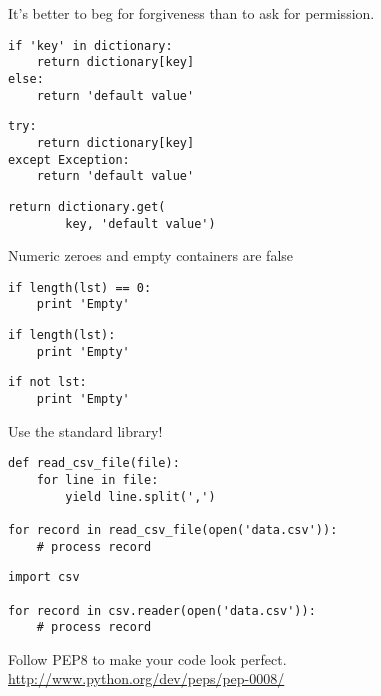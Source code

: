 \documentclass[10pt]{article}
\newenvironment{items}{\begin{itemize*}\setlength\itemsep{0pt}\setlength\parskip{0pt}\setlength\parsep{0pt}}{\end{itemize*}}
\begin{document}
\begin{items}
\item It's better to beg for forgiveness than to ask for permission.
\begin{multicols}{3}\small
\colorbox{silver}{\hspace{0.8\columnwidth}}
\begin{verbatim}
if 'key' in dictionary:
    return dictionary[key]
else:
    return 'default value'
\end{verbatim}
\columnbreak
\colorbox{silver}{\hspace{0.8\columnwidth}}
\begin{verbatim}
try:
    return dictionary[key]
except Exception:
    return 'default value'
\end{verbatim}
\columnbreak
\colorbox{silver}{\hspace{0.8\columnwidth}}
\begin{verbatim}
return dictionary.get(
        key, 'default value')
\end{verbatim}
\end{multicols}

\item Numeric zeroes and empty containers are false
\begin{multicols}{3}\small
\colorbox{silver}{\hspace{0.8\columnwidth}}
\begin{verbatim}
if length(lst) == 0:
    print 'Empty'
\end{verbatim}
\columnbreak
\colorbox{silver}{\hspace{0.8\columnwidth}}
\begin{verbatim}
if length(lst):
    print 'Empty'
\end{verbatim}
\columnbreak
\colorbox{silver}{\hspace{0.8\columnwidth}}
\begin{verbatim}
if not lst:
    print 'Empty'
\end{verbatim}
\columnbreak
\end{multicols}

\item Use the standard library!
\begin{multicols}{2}\small
\colorbox{silver}{\hspace{0.8\columnwidth}}
\begin{verbatim}
def read_csv_file(file):
    for line in file:
        yield line.split(',')

for record in read_csv_file(open('data.csv')):
    # process record
\end{verbatim}
\columnbreak
\colorbox{silver}{\hspace{0.8\columnwidth}}
\begin{verbatim}
import csv

for record in csv.reader(open('data.csv')):
    # process record
\end{verbatim}
\columnbreak
\end{multicols}

\item Follow PEP8 to make your code look perfect.
\\\url{http://www.python.org/dev/peps/pep-0008/}
\end{items}
\end{document}
